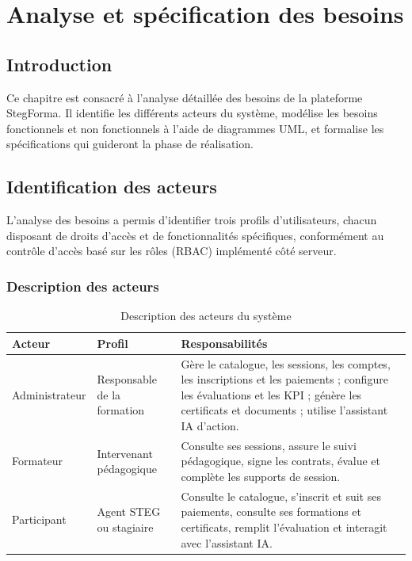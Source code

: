 \documentclass[12pt,a4paper]{report}
\begin{document}
\chapter[Analyse et spécification des besoins]{Analyse et spécification des besoins}

\section*{Introduction}
\hrulefill

Ce chapitre est consacré à l'analyse détaillée des besoins de la plateforme StegForma. Il identifie les différents acteurs du système, modélise les besoins fonctionnels et non fonctionnels à l'aide de diagrammes UML, et formalise les spécifications qui guideront la phase de réalisation.

\section{Identification des acteurs}

L'analyse des besoins a permis d'identifier trois profils d'utilisateurs, chacun disposant de droits d'accès et de fonctionnalités spécifiques, conformément au contrôle d'accès basé sur les rôles (RBAC) implémenté côté serveur.

\subsection{Description des acteurs}

\begin{table}[H]
\centering
\caption{Description des acteurs du système}
\begin{tabular}{|p{2.6cm}|p{3.6cm}|p{6.2cm}|}
\hline
\textbf{Acteur} & \textbf{Profil} & \textbf{Responsabilités} \\
\hline
Administrateur & Responsable de la formation & Gère le catalogue, les sessions, les comptes, les inscriptions et les paiements ; configure les évaluations et les KPI ; génère les certificats et documents ; utilise l'assistant IA d'action. \\
\hline
Formateur & Intervenant pédagogique & Consulte ses sessions, assure le suivi pédagogique, signe les contrats, évalue et complète les supports de session. \\
\hline
Participant & Agent STEG ou stagiaire & Consulte le catalogue, s'inscrit et suit ses paiements, consulte ses formations et certificats, remplit l'évaluation et interagit avec l'assistant IA. \\
\hline
\end{tabular}
\end{table}
\end{document}
